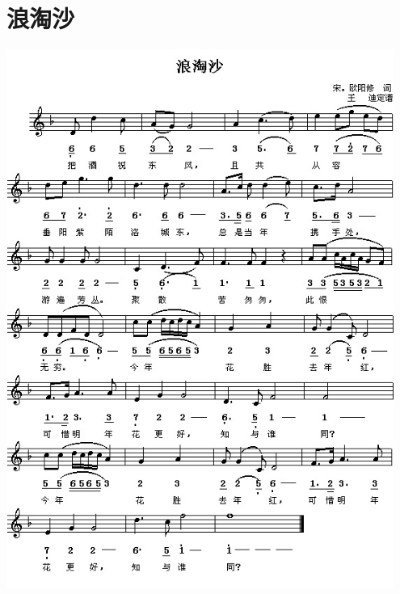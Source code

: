 \documentclass[cn,pad,twocol]{elegantbook}
\begin{document}
\section{浪淘沙}
    \includegraphics[width=0.95\textwidth]{dongxiao/20200808-浪淘沙-欧阳修.jpg}
\end{document}
